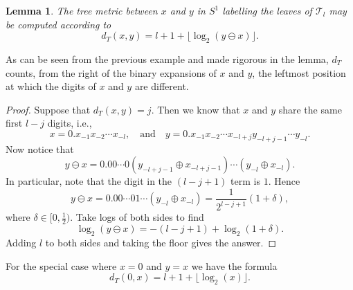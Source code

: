 \documentclass[11pt,oneside]{amsart}
\theoremstyle{plain}%
\newtheorem{lemma}[theorem]{Lemma}
\theoremstyle{definition}
\theoremstyle{remark}
\begin{document}
\begin{lemma}\label{lem:treemetric}
The tree metric between $x$ and $y$ in $S^1$ labelling the leaves of $\mathcal{T}_l$ may be computed according to
\begin{equation}
	d_T(x,y) = l+1+\lfloor \log_2(y\ominus x) \rfloor.
\end{equation}
\end{lemma}

As can be seen from the previous example and made rigorous in the lemma, $d_T$ counts, from the right of the binary expansions of $x$ and $y$, the leftmost position at which the digits of $x$ and $y$ are different.

\begin{proof}
	Suppose that $d_T(x,y) = j$. Then we know that $x$ and $y$ share the same first $l-j$ digits, i.e.,
	\begin{equation}
		x = 0.x_{-1}x_{-2}\cdots x_{-l}, \quad \text{and}\quad y=0.x_{-1}x_{-2}\cdots x_{-l+j} y_{-l+j-1}\cdots y_{-l}.
	\end{equation}
	Now notice that
	\begin{equation}
		y\ominus x = 0.00\cdots 0 (y_{-l+j-1}\oplus x_{-l+j-1})\cdots (y_{-l}\oplus x_{-l}).
	\end{equation}
	In particular, note that the digit in the $(l-j+1)$ term is $1$. Hence
	\begin{equation}
		y\ominus x = 0.00\cdots 0 1 \cdots (y_{-l}\oplus x_{-l}) = \frac{1}{2^{l-j+1}}(1+\delta),
	\end{equation}
	where $\delta \in [0,\tfrac{1}{2})$. Take logs of both sides to find
	\begin{equation}
		\log_2(y\ominus x) = -(l-j+1) + \log_2(1+\delta).
	\end{equation}
	Adding $l$ to both sides and taking the floor gives the answer.
\end{proof}

For the special case where $x=0$ and $y = x$ we have the formula
\begin{equation}
	d_T(0,x) = l+1+\lfloor \log_2(x) \rfloor.
\end{equation}
\end{document}
